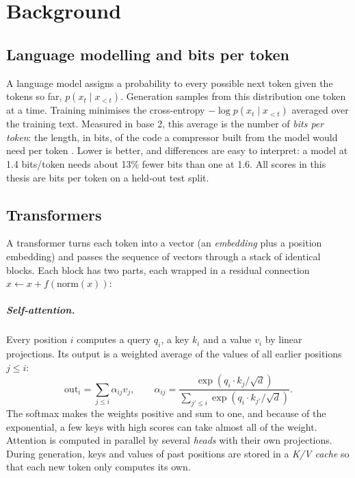 \chapter{Background}
\label{ch:background}

\section{Language modelling and bits per token}

A language model assigns a probability to every possible next token given the tokens so far,
$p(x_t \mid x_{<t})$. Generation samples from this distribution one token at a time. Training minimises the
cross-entropy $-\log p(x_t \mid x_{<t})$ averaged over the training text. Measured in base 2, this average is the
number of \emph{bits per token}: the length, in bits, of the code a compressor built from the model would need per
token \citep{shannon1948}. Lower is better, and differences are easy to interpret: a model at 1.4 bits/token needs
about 13\% fewer bits than one at 1.6. All scores in this thesis are bits per token on a held-out test split.

\section{Transformers}

A transformer \citep{vaswani2017attention} turns each token into a vector (an \emph{embedding} plus a position
embedding) and passes the sequence of vectors through a stack of identical blocks. Each block has two parts, each
wrapped in a residual connection $x \leftarrow x + f(\mathrm{norm}(x))$:

\paragraph{Self-attention.} Every position $i$ computes a query $q_i$, a key $k_i$ and a value $v_i$ by linear
projections. Its output is a weighted average of the values of all earlier positions $j \le i$:
\begin{equation}
  \mathrm{out}_i = \sum_{j \le i} \alpha_{ij} v_j, \qquad
  \alpha_{ij} = \frac{\exp(q_i \cdot k_j / \sqrt{d})}{\sum_{j' \le i} \exp(q_i \cdot k_{j'} / \sqrt{d})} .
\end{equation}
The softmax makes the weights positive and sum to one, and because of the exponential, a few keys with high scores
can take almost all of the weight. Attention is computed in parallel by several \emph{heads} with their own
projections. During generation, keys and values of past positions are stored in a \emph{K/V cache} so that each
new token only computes its own.


